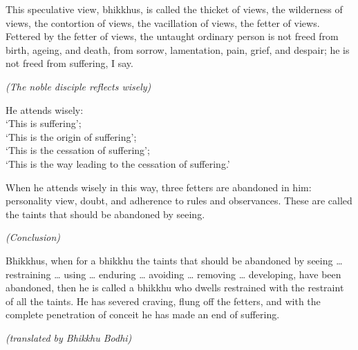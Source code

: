{This speculative view, bhikkhus, is called the thicket of views, the
wilderness of views, the contortion of views, the vacillation of views,
the fetter of views. Fettered by the fetter of views, the untaught
ordinary person is not freed from birth, ageing, and death, from sorrow,
lamentation, pain, grief, and despair; he is not freed from suffering, I
say.

\emph{(The noble disciple reflects wisely)}

He attends wisely:\\
`This is suffering';\\
`This is the origin of suffering';\\
`This is the cessation of suffering';\\
`This is the way leading to the cessation of suffering.'

When he attends wisely in this way, three fetters are abandoned in him:
personality view, doubt, and adherence to rules and observances. These
are called the taints that should be abandoned by seeing.

\enlargethispage*{2\baselineskip}

\emph{(Conclusion)}

Bhikkhus, when for a bhikkhu the taints that should be abandoned by seeing
\ldots{} restraining \ldots{} using \ldots{} enduring \ldots{} avoiding \ldots{}
removing \ldots{} developing, have been abandoned, then he is called a bhikkhu who dwells
restrained with the restraint of all the taints. He has severed craving, flung
off the fetters, and with the complete penetration of conceit he has made an end
of suffering.

\bigskip

{\raggedleft
\emph{(translated by Bhikkhu Bodhi)}
\par}

}
